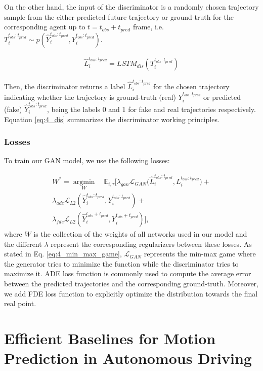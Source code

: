 On the other hand, the input of the discriminator is a randomly chosen trajectory sample from the either predicted future trajectory or ground-truth for the corresponding agent up to $t = t_{obs} + t_{pred}$ frame, i.e.  $T_i^{t_{obs}:t_{pred}}\sim p(\hat{Y}_i^{t_{obs}:t_{pred}},Y_i^{t_{obs}:t_{pred}})$.

\begin{eqnarray}
	\label{eq:4_dis}
	\hat{L}_{i}^{t_{obs}:t_{pred}} = LSTM_{dis}(T_i^{t_{obs}:t_{pred}})
\end{eqnarray}

Then, the discriminator returns a label $\hat{L}_{i}^{t_{obs}:t_{pred}}$ for the chosen trajectory indicating whether the trajectory is ground-truth (real) $Y_i^{t_{obs}:t_{pred}}$ or predicted (fake) $\hat{Y}_i^{t_{obs}:t_{pred}}$, being the labels 0 and 1 for fake and real trajectories respectively. Equation \ref{eq:4_dis} summarizes the discriminator working principles. 

\subsubsection{Losses}

To train our \ac{GAN} model, we use the following losses:

\begin{eqnarray}
	\label{eq:obj}
	W^* =\operatorname*{argmin}_W \quad\mathbb{E}_{i,\tau}[\lambda_{gan} \mathcal{L}_{GAN}\big(\hat{L}_{i}^{t_{obs}:t_{pred}}, L_{i}^{t_{obs}:t_{pred}} \big)+ \nonumber\\
	\lambda_{ade} \mathcal{L}_{L2}(\hat{Y}_i^{t_{obs}:t_{pred}},Y_i^{t_{obs}:t_{pred}})+ \nonumber\\
	\lambda_{fde} \mathcal{L}_{L2}(\hat{Y}_i^{t_{obs}+t_{pred}},Y_i^{t_{obs}+t_{pred}})],
\end{eqnarray}
%
where $W$ is the collection of the weights of all networks used in our model and the different $\lambda$ represent the corresponding regularizers between these losses. As stated in Eq. \ref{eq:4_min_max_game}, $\mathcal{L}_{GAN}$ represents the min-max game where the generator tries to minimize the function while the discriminator tries to maximize it. ADE loss function is commonly used to compute the average error between the predicted trajectories and the corresponding ground-truth. Moreover, we add FDE loss function to explicitly optimize the distribution towards the final real point.

\section{Efficient Baselines for Motion Prediction in Autonomous Driving}
\label{sec:4_efficient_baselines}


